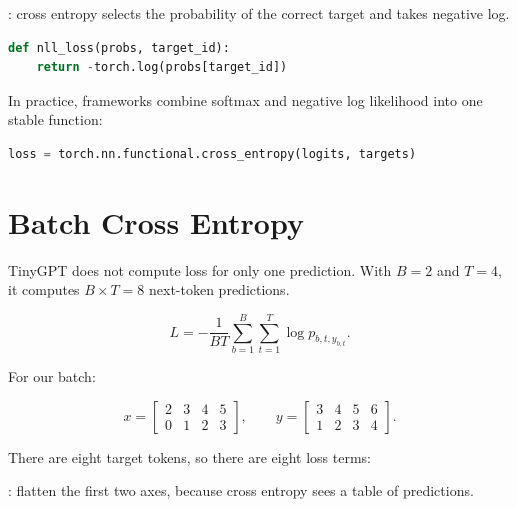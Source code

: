 : cross entropy selects the probability of the correct target and takes negative log.

\begin{lstlisting}[language=Python]
def nll_loss(probs, target_id):
    return -torch.log(probs[target_id])
\end{lstlisting}

In practice, frameworks combine softmax and negative log likelihood into one stable function:

\begin{lstlisting}[language=Python]
loss = torch.nn.functional.cross_entropy(logits, targets)
\end{lstlisting}

\section{Batch Cross Entropy}

TinyGPT does not compute loss for only one prediction. With \(B=2\) and \(T=4\), it computes \(B\times T=8\) next-token predictions.

\[
L = -\frac{1}{BT}
\sum_{b=1}^{B}\sum_{t=1}^{T}
\log p_{b,t,y_{b,t}}.
\]

For our batch:

\[
x =
\begin{bmatrix}
2 & 3 & 4 & 5\\
0 & 1 & 2 & 3
\end{bmatrix},
\qquad
y =
\begin{bmatrix}
3 & 4 & 5 & 6\\
1 & 2 & 3 & 4
\end{bmatrix}.
\]

There are eight target tokens, so there are eight loss terms:

\begin{center}
\end{center}

: flatten the first two axes, because cross entropy sees a table of predictions.

